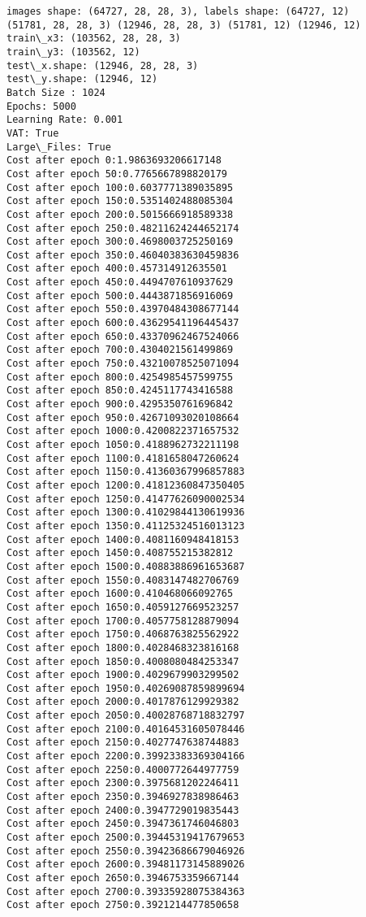 \documentclass[11pt]{article}
\begin{document}
\begin{Verbatim}[commandchars=\\\{\}]
 images shape: (64727, 28, 28, 3), labels shape: (64727, 12)
(51781, 28, 28, 3) (12946, 28, 28, 3) (51781, 12) (12946, 12)
train\_x3: (103562, 28, 28, 3)
train\_y3: (103562, 12)
test\_x.shape: (12946, 28, 28, 3)
test\_y.shape: (12946, 12)
Batch Size : 1024
Epochs: 5000
Learning Rate: 0.001
VAT: True
Large\_Files: True 
Cost after epoch 0:1.9863693206617148
Cost after epoch 50:0.7765667898820179
Cost after epoch 100:0.6037771389035895
Cost after epoch 150:0.5351402488085304
Cost after epoch 200:0.5015666918589338
Cost after epoch 250:0.48211624244652174
Cost after epoch 300:0.4698003725250169
Cost after epoch 350:0.46040383630459836
Cost after epoch 400:0.457314912635501
Cost after epoch 450:0.4494707610937629
Cost after epoch 500:0.4443871856916069
Cost after epoch 550:0.43970484308677144
Cost after epoch 600:0.43629541196445437
Cost after epoch 650:0.43370962467524066
Cost after epoch 700:0.4304021561499869
Cost after epoch 750:0.43210078525071094
Cost after epoch 800:0.4254985457599755
Cost after epoch 850:0.4245117743416588
Cost after epoch 900:0.4295350761696842
Cost after epoch 950:0.42671093020108664
Cost after epoch 1000:0.4200822371657532
Cost after epoch 1050:0.4188962732211198
Cost after epoch 1100:0.4181658047260624
Cost after epoch 1150:0.41360367996857883
Cost after epoch 1200:0.41812360847350405
Cost after epoch 1250:0.41477626090002534
Cost after epoch 1300:0.41029844130619936
Cost after epoch 1350:0.41125324516013123
Cost after epoch 1400:0.4081160948418153
Cost after epoch 1450:0.408755215382812
Cost after epoch 1500:0.40883886961653687
Cost after epoch 1550:0.4083147482706769
Cost after epoch 1600:0.410468066092765
Cost after epoch 1650:0.4059127669523257
Cost after epoch 1700:0.4057758128879094
Cost after epoch 1750:0.4068763825562922
Cost after epoch 1800:0.4028468323816168
Cost after epoch 1850:0.4008080484253347
Cost after epoch 1900:0.4029679903299502
Cost after epoch 1950:0.40269087859899694
Cost after epoch 2000:0.4017876129929382
Cost after epoch 2050:0.40028768718832797
Cost after epoch 2100:0.40164531605078446
Cost after epoch 2150:0.4027747638744883
Cost after epoch 2200:0.39923383369304166
Cost after epoch 2250:0.4000772644977759
Cost after epoch 2300:0.3975681202246411
Cost after epoch 2350:0.3946927838986463
Cost after epoch 2400:0.3947729019835443
Cost after epoch 2450:0.3947361746046803
Cost after epoch 2500:0.39445319417679653
Cost after epoch 2550:0.39423686679046926
Cost after epoch 2600:0.39481173145889026
Cost after epoch 2650:0.3946753359667144
Cost after epoch 2700:0.39335928075384363
Cost after epoch 2750:0.3921214477850658

\end{Verbatim}
\end{document}
